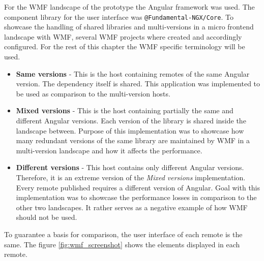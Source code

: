 For the WMF landscape of the prototype the Angular framework was used. The component library for the user interface was \texttt{@Fundamental-NGX/Core}. To showcase the handling of shared libraries and multi-versions in a micro frontend landscape with WMF, several WMF projects where created and accordingly configured.
For the rest of this chapter the WMF specific terminology will be used.

\begin{itemize}
	\item \textbf{Same versions} - This is the host containing remotes of the same Angular version. The dependency itself is shared. This application was implemented to be used as comparison to the multi-version hosts.
	
	\item \textbf{Mixed versions} - This is the host containing partially the same and different Angular versions. Each version of the library is shared inside the landscape between. Purpose of this implementation was to showcase how many redundant versions of the same library are maintained by WMF in a multi-version landscape and how it affects the performance.
	
	\item \textbf{Different versions} - This host contains only different Angular versions. Therefore, it is an extreme version of the \textit{Mixed versions} implementation. Every remote published requires a different version of Angular. Goal with this implementation was to showcase the performance losses in comparison to the other two landscapes. It rather serves as a negative example of how WMF should not be used.
\end{itemize}

To guarantee a basis for comparison, the user interface of each remote is the same. The figure \ref{fig:wmf_screenshot} shows the elements displayed in each remote.

